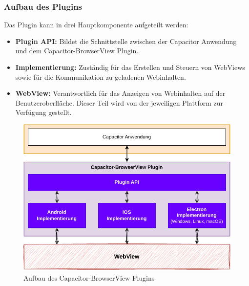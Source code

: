 \subsubsection{Aufbau des Plugins}

Das Plugin kann in drei Hauptkomponente aufgeteilt werden:

\begin{itemize}
    \item \textbf{Plugin API:} Bildet die Schnittstelle zwischen der Capacitor Anwendung und dem Capacitor-BrowserView Plugin.
    \item \textbf{Implementierung:} Zuständig für das Erstellen und Steuern von WebViews sowie für die Kommunikation zu geladenen Webinhalten.
    \item \textbf{WebView:}
    Verantwortlich für das Anzeigen von Webinhalten auf der Benutzeroberfläche.
    Dieser Teil wird von der jeweiligen Plattform zur Verfügung gestellt.
    \cite{android:api, ios:api, electron:docs}
\end{itemize}

\begin{figure}[H]
    \centering
    \includegraphics[width=\textwidth]{assets/03_Capacitor-BrowserView/02_Aufbau.drawio.pdf}
    \caption[Capacitor-BrowserView / Aufbau]{Aufbau des Capacitor-BrowserView Plugins}
\end{figure}
